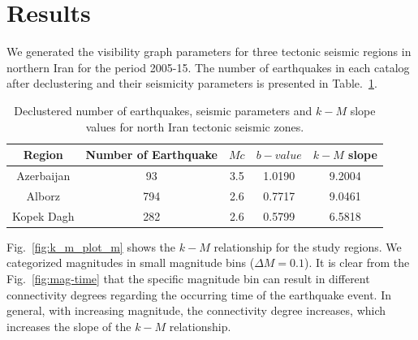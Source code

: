\section{Results}
\noindent
We generated the visibility graph parameters for three tectonic seismic regions in northern Iran for the period 2005-15. The number of earthquakes in each catalog after declustering and their seismicity parameters is presented in Table.~\ref{tab:b_k_m_param}. 

\begin{table}[h]
\centering
\caption{Declustered number of earthquakes, seismic parameters and $k-M$ slope values for north Iran tectonic seismic zones.}
\begin{tabular}{ccccc}
Region          & Number of Earthquake &  $Mc$ &  $b-value$ & $k-M$ slope \\ \hline
Azerbaijan     & 93                                 & 3.5   & 1.0190  & 9.2004       \\ \hline
Alborz            & 794                               & 2.6   & 0.7717  & 9.0461      \\ \hline
Kopek Dagh  & 282                               & 2.6   & 0.5799  & 6.5818     \\ \hline
\end{tabular}
\label{tab:b_k_m_param}
\end{table}

\noindent
Fig.~\ref{fig:k_m_plot_m}  shows the  $k-M$  relationship for the study regions. We categorized magnitudes in small magnitude bins ($\Delta M=0.1$). It is clear from the Fig.~\ref{fig:mag-time} that the specific magnitude bin can result in different connectivity degrees regarding the occurring time of the earthquake event. In general, with increasing magnitude, the connectivity degree increases, which increases the slope of the  $k-M$  relationship. 

